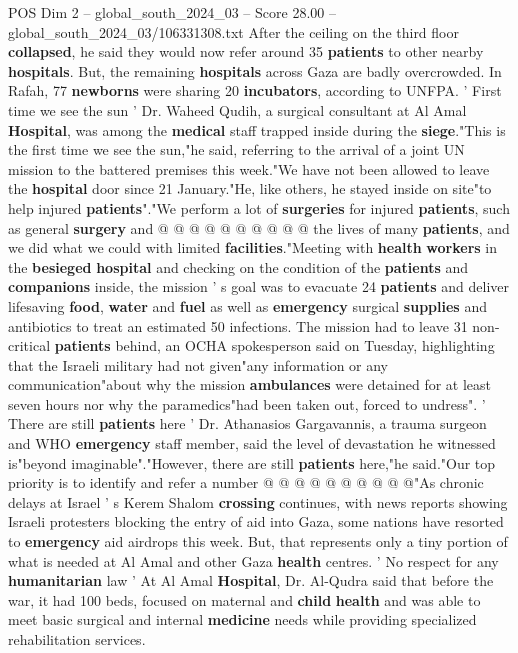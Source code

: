 \begin{textsample}{POS Dim 2 – global\_south\_2024\_03 – Score 28.00 – global\_south\_2024\_03/106331308.txt}
After the ceiling on the third floor \textbf{collapsed}, he said they would now refer around 35 \textbf{patients} to other nearby \textbf{hospitals}.
But, the remaining \textbf{hospitals} across Gaza are badly overcrowded.
In Rafah, 77 \textbf{newborns} were sharing 20 \textbf{incubators}, according to UNFPA. ' First time we see the sun ' Dr.
Waheed Qudih, a surgical consultant at Al Amal \textbf{Hospital}, was among the \textbf{medical} staff trapped inside during the \textbf{siege}."This is the first time we see the sun,"he said, referring to the arrival of a joint UN mission to the battered premises this week."We have not been allowed to leave the \textbf{hospital} door since 21 January."He, like others, he stayed inside on site"to help injured \textbf{patients}"."We perform a lot of \textbf{surgeries} for injured \textbf{patients}, such as general \textbf{surgery} and @ @ @ @ @ @ @ @ @ @ the lives of many \textbf{patients}, and we did what we could with limited \textbf{facilities}."Meeting with \textbf{health} \textbf{workers} in the \textbf{besieged} \textbf{hospital} and checking on the condition of the \textbf{patients} and \textbf{companions} inside, the mission ' s goal was to evacuate 24 \textbf{patients} and deliver lifesaving \textbf{food}, \textbf{water} and \textbf{fuel} as well as \textbf{emergency} surgical \textbf{supplies} and antibiotics to treat an estimated 50 infections.
The mission had to leave 31 non-critical \textbf{patients} behind, an OCHA spokesperson said on Tuesday, highlighting that the Israeli military had not given"any information or any communication"about why the mission \textbf{ambulances} were detained for at least seven hours nor why the paramedics"had been taken out, forced to undress". ' There are still \textbf{patients} here ' Dr.
Athanasios Gargavannis, a trauma surgeon and WHO \textbf{emergency} staff member, said the level of devastation he witnessed is"beyond imaginable"."However, there are still \textbf{patients} here,"he said."Our top priority is to identify and refer a number @ @ @ @ @ @ @ @ @ @"As chronic delays at Israel ' s Kerem Shalom \textbf{crossing} continues, with news reports showing Israeli protesters blocking the entry of aid into Gaza, some nations have resorted to \textbf{emergency} aid airdrops this week.
But, that represents only a tiny portion of what is needed at Al Amal and other Gaza \textbf{health} centres. ' No respect for any \textbf{humanitarian} law ' At Al Amal \textbf{Hospital}, Dr.
Al-Qudra said that before the war, it had 100 beds, focused on maternal and \textbf{child} \textbf{health} and was able to meet basic surgical and internal \textbf{medicine} needs while providing specialized rehabilitation services.

\end{textsample}
